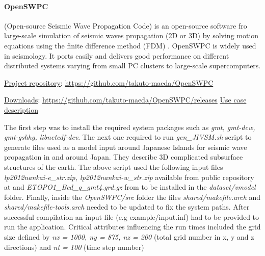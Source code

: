 \paragraph{OpenSWPC} (Open-source Seismic Wave Propagation Code) is an open-source software fro large-scale simulation of seismic waves propagation (2D or 3D) by solving motion equations using the finite difference method (FDM) \cite{OpenSWPC2}. OpenSWPC is widely used in seismology. It ports easily and delivers good performance on different distributed systems varying from small PC clusters to large-scale supercomputers.
\iffalse
Without modifying the code, users can simulate seismic wave propagation using their own speed structure models and the necessary source representations in the input parameter file. The software code is equipped with a frequency-independent damping model based on a generalised Zener (standard linear solid - SLS model) body and an efficiently selected, perfectly matched boundary absorbing layer. It has different modes for the different input data types of the velocity structure model and different source representations, such as single force, torque tensioner and flat frequency, which can be easily selected by input parameters. Common binary data formats, a common network data form (NetCDF), and a seismic analysis code (SAC) are used to input a heterogeneous structure model and simulation results so that users can easily operate their input and output data sets. All codes are written in Fortran 2003 and are available with detailed documents in a public repository.
\fi

\underline{Project repository}: \url{https://github.com/takuto-maeda/OpenSWPC}

\underline{Downloads}: \url{https://github.com/takuto-maeda/OpenSWPC/releases}
\iffalse
\underline{Use case description}

The first step was to install the required system packages such as \textit{gmt, gmt-dcw, gmt-gshhg, libnetcdf-dev}. The next one required to run \textit{gen\_JIVSM.sh} script to generate files used as a model input around Japanese Islands for seismic wave propagation in and around Japan. They describe 3D complicated subsurface structures of the earth. The above script used the following input files \textit{lp2012nankai-e\_str.zip, lp2012nankai-w\_str.zip} available from public repository at \cite{HERP} and \textit{ETOPO1\_Bed\_g\_gmt4.grd.gz} from \cite{NOAA} to be installed in the \textit{dataset/vmodel} folder.
Finally, inside the \textit{OpenSWPC/src} folder the files \textit{shared/makefile.arch} and \textit{shared/makefile-tools.arch} needed to be updated to fix the system paths.
After successful compilation an input file (e.g example/input.inf) had to be provided to run the application. Critical attributes influencing the run times included the grid size defined by \textit{nx = 1000, ny = 875, nz = 200}   (total grid number in x, y and z directions) and \textit{nt = 100}  (time step number)

